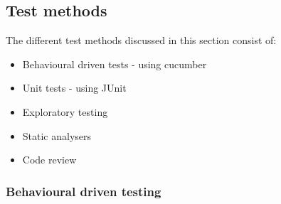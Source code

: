 \subsection{Test methods}
The different test methods discussed in this section consist of:
\begin{itemize}
    \item Behavioural driven tests - using cucumber 
    \item Unit tests - using JUnit
    \item Exploratory testing
    \item Static analysers
    \item Code review 
\end{itemize}

\subsubsection{Behavioural driven testing}





